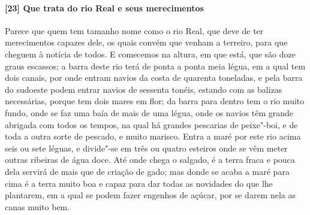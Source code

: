 \begin{linenumbers}
\paragraph{[23] Que trata do rio Real e seus merecimentos} \quad
Parece que quem tem tamanho nome como o rio Real, que deve de ter merecimentos capazes
dele, os quais convém que venham a terreiro, para que cheguem à notícia de todos. E
comecemos na altura, em que está, que são doze graus escassos; a barra deste rio terá de
ponta a ponta meia légua, em a qual tem dois canais, por onde entram navios da costa de
quarenta toneladas, e pela barra do sudoeste podem entrar navios de sessenta tonéis,
estando com as balizas necessárias, porque tem dois mares em flor; da barra para dentro
tem o rio muito fundo, onde se faz uma baía de mais de uma légua, onde os navios têm
grande abrigada com todos os tempos, na qual há grandes pescarias de peixe"-boi, e de toda
a outra sorte de pescado, e muito marisco. Entra a maré por este rio acima seis ou sete
léguas, e divide"-se em três ou quatro esteiros onde se vêm meter outras ribeiras de água
doce. Até onde chega o salgado, é a terra fraca e pouca dela servirá de mais que de
criação de gado; mas donde se acaba a maré para cima é a terra muito boa e capaz para dar
todas as novidades do que lhe plantarem, em a qual se podem fazer engenhos de açúcar, por
se darem nela as canas muito bem.


\end{linenumbers}
